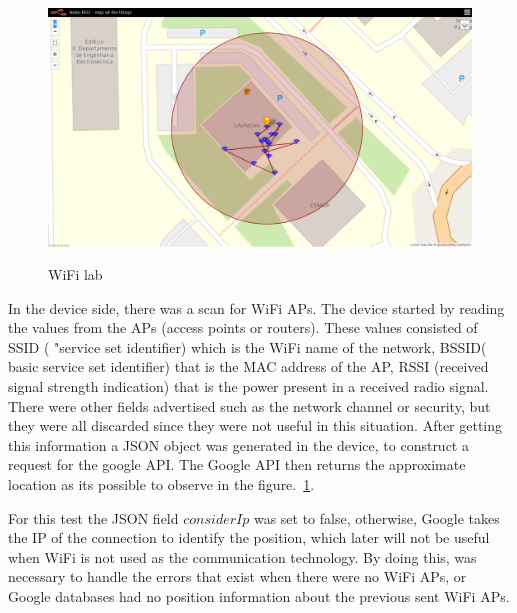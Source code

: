 \begin{figure}[htbp]
  \centering

    {\includegraphics[width=0.6\linewidth]{Chapters/Figures/wifilab.png}}%

  \caption{WiFi lab}
  \label{fig:WiFi_geo}
\end{figure}
In the device side, there was a scan for WiFi APs. The device started by reading the values from the APs (access points or routers). These values consisted of SSID ( "service set identifier) which is the WiFi name of the network,
BSSID( basic service set identifier) that is the  MAC address of the AP, RSSI (received signal strength indication) that is the power present in a received radio signal. There were other fields advertised such as the network channel or security, but they were all discarded since they were not useful in this situation.
After getting this information a JSON object was generated in the device, to construct a request for the google API.
The Google API then returns the approximate location as its possible to observe in the figure.~\ref{fig:WiFi_geo}.





For this test the JSON field $considerIp$ was set to false, otherwise, Google takes the IP of the connection to identify the position, which later will not be useful when WiFi is not used as the communication technology. By doing this, was necessary to handle the errors that exist when there were no WiFi APs, or Google databases had no position information about the  previous sent WiFi APs.

